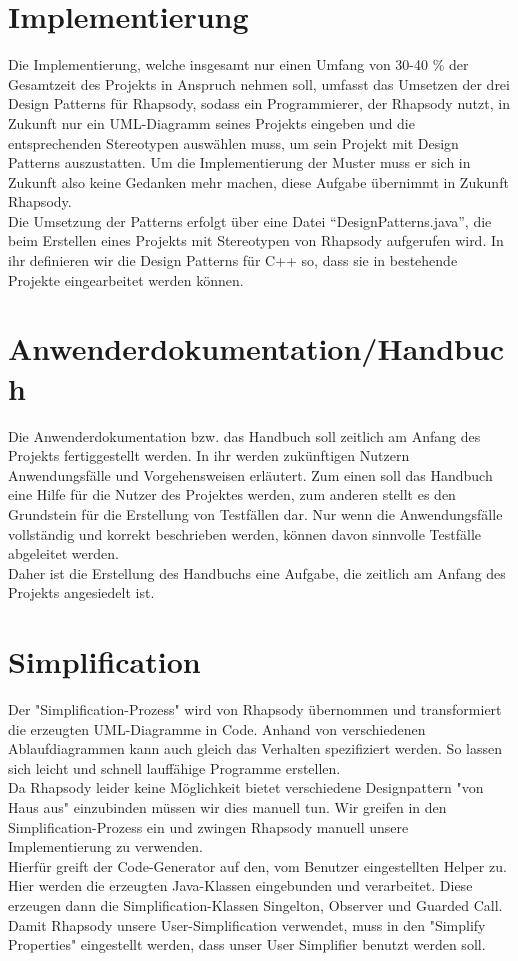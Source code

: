 \section{Implementierung}

Die Implementierung, welche insgesamt nur einen Umfang von 30-40 \% der Gesamtzeit des Projekts in Anspruch nehmen soll, umfasst das Umsetzen der drei Design Patterns für Rhapsody, sodass ein Programmierer, der Rhapsody nutzt, in Zukunft nur ein UML-Diagramm seines Projekts eingeben und die entsprechenden Stereotypen auswählen muss, um sein Projekt mit Design Patterns auszustatten. Um die Implementierung der Muster muss er sich in Zukunft also keine Gedanken mehr machen, diese Aufgabe übernimmt in Zukunft Rhapsody.\\
Die Umsetzung der Patterns erfolgt über eine Datei “DesignPatterns.java”, die beim Erstellen eines Projekts mit Stereotypen von Rhapsody aufgerufen wird. In ihr definieren wir die Design Patterns für C++ so, dass sie in bestehende Projekte eingearbeitet werden können.

\section{Anwenderdokumentation/Handbuch}

Die Anwenderdokumentation bzw. das Handbuch soll zeitlich am Anfang des Projekts fertiggestellt werden. In ihr werden zukünftigen Nutzern Anwendungsfälle und Vorgehensweisen erläutert. Zum einen soll das Handbuch eine Hilfe für die Nutzer des Projektes werden, zum anderen stellt es den Grundstein für die Erstellung von Testfällen dar. Nur wenn die Anwendungsfälle vollständig und korrekt beschrieben werden, können davon sinnvolle Testfälle abgeleitet werden.\\
Daher ist die Erstellung des Handbuchs eine Aufgabe, die zeitlich am Anfang des Projekts angesiedelt ist.

\section{Simplification}
Der "Simplification-Prozess" wird von Rhapsody übernommen und transformiert die
erzeugten UML-Diagramme in Code. Anhand von verschiedenen Ablaufdiagrammen kann
auch gleich das Verhalten spezifiziert werden. So lassen sich leicht und schnell
lauffähige Programme erstellen.\\
\newline
Da Rhapsody leider keine Möglichkeit bietet verschiedene Designpattern "von Haus
aus" einzubinden müssen wir dies manuell tun. Wir greifen in den
Simplification-Prozess ein und zwingen Rhapsody manuell unsere Implementierung
zu verwenden.\\
Hierfür greift der Code-Generator auf den, vom Benutzer eingestellten Helper zu.
Hier werden die erzeugten Java-Klassen eingebunden und verarbeitet. Diese
erzeugen dann die Simplification-Klassen Singelton, Observer und Guarded Call.
Damit Rhapsody unsere User-Simplification verwendet, muss in den "Simplify
Properties" eingestellt werden, dass unser User Simplifier benutzt werden soll.
\cite{oldDoku}

